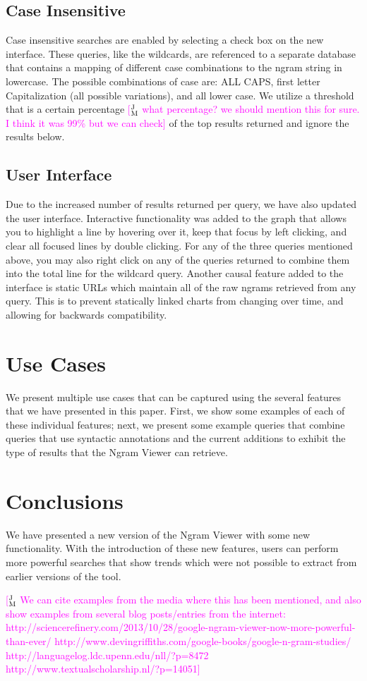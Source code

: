 \documentclass[11pt]{article}
\newcommand{\jmcomment}[1]{\textcolor{magenta}{[$^{\textsc{J}}_{\textsc{M}}$ #1]}}
\begin{document}
\subsection{Case Insensitive}
Case insensitive searches are enabled by selecting a check box on the new interface. These queries, like the wildcards, are referenced to a separate database that contains a mapping of different case combinations to the ngram string in lowercase. The possible combinations of case are: ALL CAPS, first letter Capitalization (all possible variations), and all lower case. We utilize a threshold that is a certain percentage \jmcomment{what percentage? we should mention this for sure. I think it was 99\% but we can check} of the top results returned and ignore the results below.



\subsection{User Interface}
\label{sec:userint}
Due to the increased number of results returned per query, we have also updated the user interface. Interactive functionality was added to the graph that allows you to highlight a line by hovering over it, keep that focus by left clicking, and clear all focused lines by double clicking. For any of the three queries mentioned above, you may also right click on any of the queries returned to combine them into the total line for the wildcard query. Another causal feature added to the interface is static URLs which maintain all of the raw ngrams retrieved from any query. This is to prevent statically linked charts from changing over time, and allowing for backwards compatibility.


\section{Use Cases}
\label{sec:usecases}
We present multiple use cases that can be captured using the several features that we have presented in this paper. First, we show some examples of each of these individual features; next, we present some example queries that combine queries that use syntactic annotations and the current additions to exhibit the type of results that the Ngram Viewer can retrieve.


\section{Conclusions}
We have presented a new version of the Ngram Viewer with some new functionality. With the introduction of these new features, users can perform more powerful searches that show trends which were not possible to extract from earlier versions of the tool. 

\jmcomment{We can cite examples from the media where this has been mentioned, and also show examples from several blog posts/entries from the internet:
http://sciencerefinery.com/2013/10/28/google-ngram-viewer-now-more-powerful-than-ever/
http://www.devingriffiths.com/google-books/google-n-gram-studies/
http://languagelog.ldc.upenn.edu/nll/?p=8472
http://www.textualscholarship.nl/?p=14051}





\end{document}
